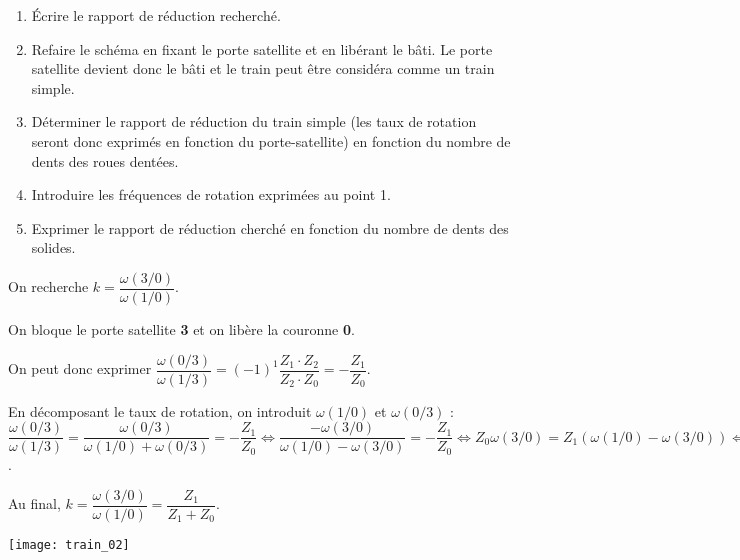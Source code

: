 \ifprof
\begin{corrige}
\begin{methode}
\begin{enumerate}
\item Écrire le rapport de réduction recherché.
\item Refaire le schéma en fixant le porte satellite et en libérant le bâti. Le porte satellite devient donc le bâti et le train peut être considéra comme un train simple.
\item Déterminer le rapport de réduction du train simple (les taux de rotation seront donc exprimés en fonction du porte-satellite) en fonction du nombre de dents des roues dentées.
\item Introduire les fréquences de rotation exprimées au point 1.
\item Exprimer le rapport de réduction cherché en fonction du  nombre de dents des solides. 
\end{enumerate}
\end{methode}


On recherche $k=\dfrac{\omega(3/0)}{\omega(1/0)}$. 

On bloque le porte satellite \textbf{3} et on libère la couronne \textbf{0}. 

On peut donc exprimer $ \dfrac{\omega(0/3)}{\omega(1/3)} = (-1)^1\dfrac{Z_1\cdot Z_2}{Z_2\cdot Z_0} = -\dfrac{Z_1}{Z_0}$.

En décomposant le taux de rotation, on introduit $\omega(1/0)$ et $\omega(0/3)$ :
$ \dfrac{\omega(0/3)}{\omega(1/3)} =  \dfrac{\omega(0/3)}{\omega(1/0)+\omega(0/3)} = -\dfrac{Z_1}{Z_0} 
\Leftrightarrow \dfrac{-\omega(3/0)}{\omega(1/0)-\omega(3/0)}  =-\dfrac{Z_1}{Z_0}  \Leftrightarrow {Z_0} \omega(3/0)  =Z_1 \left( \omega(1/0)-\omega(3/0)\right) 
\Leftrightarrow  \omega(3/0) \left(Z_0 + Z_1\right) =Z_1 \omega(1/0) 
\Leftrightarrow \dfrac{\omega(3/0)}{\omega(1/0)} = \dfrac{Z_1}{Z_1+Z_0}$.

Au final, $k = \dfrac{\omega(3/0)}{\omega(1/0)} = \dfrac{Z_1}{Z_1+Z_0}$.
\begin{center}
\texttt{[image: train\_02]}
\end{center}

\end{corrige}
\else
\fi



